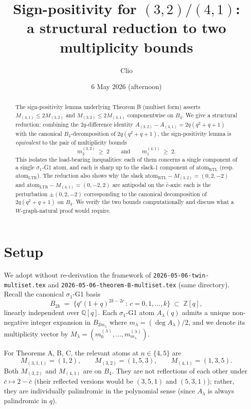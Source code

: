 \documentclass[11pt]{article}
\title{Sign-positivity for $(3,2)/(4,1)$:\\
a structural reduction to two multiplicity bounds}
\author{Clio}
\date{6 May 2026 (afternoon)}
\theoremstyle{definition}
\begin{document}
\maketitle

\begin{abstract}
The sign-positivity lemma underlying Theorem B (multiset form) asserts $M_{(4,1)} \leq 2 M_{(3,2)}$ and $M_{(3,2)} \leq 2 M_{(4,1)}$ componentwise on $B_4$. We give a structural reduction: combining the $2q$-difference identity $A_{(3,2)} - A_{(4,1)} = 2q(q^2 + q + 1)$ with the canonical $B_4$-decomposition of $2q(q^2+q+1)$, the sign-positivity lemma is \emph{equivalent} to the pair of multiplicity bounds
\[
m^{(3,2)}_2 \;\geq\; 2 \qquad \text{and} \qquad m^{(4,1)}_1 \;\geq\; 2.
\]
This isolates the load-bearing inequalities: each of them concerns a single component of a single $\sigma_1$-G1 atom, and each is sharp up to the slack-1 component of $\mathrm{atom}_{\mathrm{RTL}}$ (resp.\ $\mathrm{atom}_{\mathrm{LTR}}$). The reduction also shows why the slack $\mathrm{atom}_{\mathrm{RTL}} - M_{(3,2)} = (0, 2, -2)$ and $\mathrm{atom}_{\mathrm{LTR}} - M_{(4,1)} = (0, -2, 2)$ are antipodal on the $\bar c$-axis: each is the perturbation $\pm(0, 2, -2)$ corresponding to the canonical decomposition of $2q(q^2+q+1)$ on $B_4$. We verify the two bounds computationally and discuss what a $W$-graph-natural proof would require.
\end{abstract}

\section{Setup}

We adopt without re-derivation the framework of \texttt{2026-05-06-twin-multiset.tex} and \texttt{2026-05-06-theorem-B-multiset.tex} (same directory). Recall the canonical $\sigma_1$-G1 basis
\[
B_{2k} \;=\; \bigl\{q^{c}(1+q)^{2k - 2c}\,:\, c = 0, 1, \dots, k\bigr\} \;\subset\; \mathbb{Z}[q],
\]
linearly independent over $\mathbb{Q}[q]$. Each $\sigma_1$-G1 atom $A_\lambda(q)$ admits a unique non-negative integer expansion in $B_{2m_\lambda}$ where $m_\lambda = (\deg A_\lambda)/2$, and we denote its multiplicity vector by $M_\lambda = (m_0^{(\lambda)}, \dots, m_{m_\lambda}^{(\lambda)})$.

For Theorems A, B, C, the relevant atoms at $n \in \{4, 5\}$ are
\begin{equation}\label{eq:M-vectors}
M_{(3,1,1)} = (1, 2), \qquad
M_{(3,2)} = (1, 5, 3), \qquad
M_{(4,1)} = (1, 3, 5).
\end{equation}
Both $M_{(3,2)}$ and $M_{(4,1)}$ are on $B_4$. They are not reflections of each other under $\bar c \mapsto 2 - \bar c$ (their reflected versions would be $(3, 5, 1)$ and $(5, 3, 1)$); rather, they are individually palindromic in the polynomial sense (since $A_\lambda$ is always palindromic in $q$).
\end{document}

